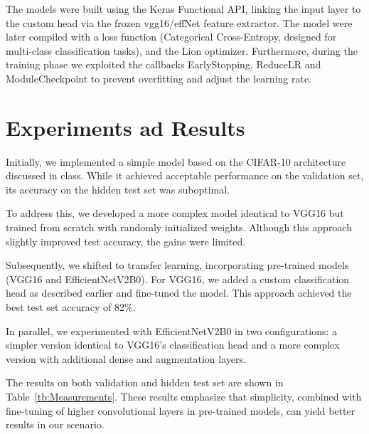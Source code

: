 \documentclass[11pt]{article}
\begin{document}
\begin{multicols*}{2}
        The models were built using the Keras Functional API, linking the input layer to the custom head via the frozen vgg16/effNet feature extractor. The model were later compiled with a loss function (Categorical Cross-Entropy, designed for multi-class classification tasks), and the Lion optimizer. Furthermore, during the training phase we exploited the callbacks EarlyStopping, ReduceLR and ModuleCheckpoint to prevent overfitting and adjust the learning rate.

        \section{Experiments ad Results}
        
        Initially, we implemented a simple model based on the CIFAR-10 architecture discussed in class. While it achieved acceptable performance on the validation set, its accuracy on the hidden test set was suboptimal.
        
        To address this, we developed a more complex model identical to VGG16 but trained from scratch with randomly initialized weights. Although this approach slightly improved test accuracy, the gains were limited.
        
        Subsequently, we shifted to transfer learning, incorporating pre-trained models (VGG16 and EfficientNetV2B0). For VGG16, we added a custom classification head as described earlier and fine-tuned the model. This approach achieved the best test set accuracy of 82\%.
        
        In parallel, we experimented with EfficientNetV2B0 in two configurations: a simpler version identical to VGG16's classification head and a more complex version with additional dense and augmentation layers.
        
        The results on both validation and hidden test set are shown in Table~\ref{tb:Measurements}. These results emphasize that simplicity, combined with fine-tuning of higher convolutional layers in pre-trained models, can yield better results in our scenario.
    

\end{multicols*}
\end{document}
